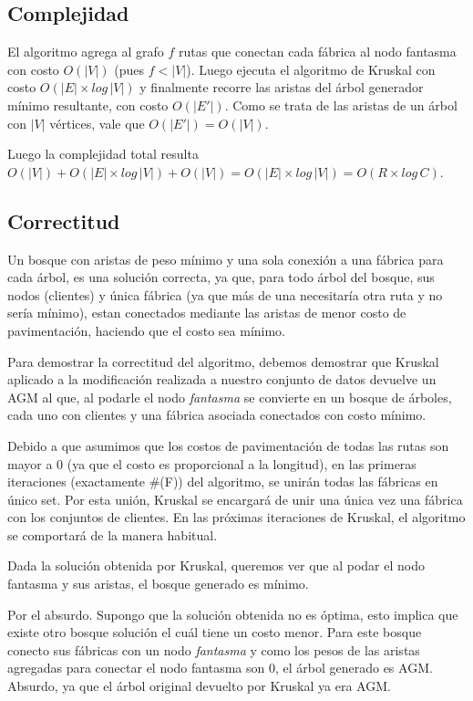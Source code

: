 \documentclass[a4paper, 10pt, twoside]{article}
\begin{document}
\subsection{Complejidad}

El algoritmo agrega al grafo $f$ rutas que conectan cada fábrica al nodo fantasma con costo $O(|V|)$ (pues $f < |V|$). Luego ejecuta el algoritmo de Kruskal con costo $O(|E| \times log\, |V|)$ y finalmente recorre las aristas del árbol generador mínimo resultante, con costo $O(|E'|)$. Como se trata de las aristas de un árbol con $|V|$ vértices, vale que $O(|E'|) = O(|V|)$.

Luego la complejidad total resulta $O(|V|) + O(|E| \times log\, |V|) + O(|V|) = O(|E| \times log\, |V|) = O(R \times log\, C)$.


\subsection{Correctitud}

Un bosque con aristas de peso mínimo y una sola conexión a una fábrica para cada árbol, es una solución correcta, ya que, para todo árbol del bosque, sus nodos (clientes) y única fábrica (ya que más de una necesitaría otra ruta y no sería mínimo), estan conectados mediante las aristas de menor costo de pavimentación, haciendo que el costo sea mínimo.

Para demostrar la correctitud del algoritmo, debemos demostrar que Kruskal aplicado a la modificación realizada a nuestro conjunto de datos devuelve un AGM al que, al podarle el nodo \textit{fantasma} se convierte en un bosque de árboles, cada uno con clientes y una fábrica asociada conectados con costo mínimo.

Debido a que asumimos que los costos de pavimentación de todas las rutas son mayor a 0 (ya que el costo es proporcional a la longitud), en las primeras iteraciones (exactamente \#(F)) del algoritmo, se unirán todas las fábricas en único set. Por esta unión, Kruskal se encargará de unir una única vez una fábrica con los conjuntos de clientes. En las próximas iteraciones de Kruskal, el algoritmo se comportará  de la manera habitual.

Dada la solución obtenida por Kruskal, queremos ver que al podar el nodo fantasma y sus aristas, el bosque generado es mínimo.

Por el absurdo. Supongo que la solución obtenida no es óptima, esto implica que existe otro bosque solución el cuál tiene un costo menor. Para este bosque conecto sus fábricas con un nodo \textit{fantasma} y como los pesos de las aristas agregadas para conectar el nodo fantasma son 0, el árbol generado es AGM. Absurdo, ya que el árbol original devuelto por Kruskal ya era AGM.
\end{document}
